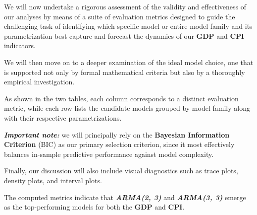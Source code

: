 \documentclass{Configuration_Files/PoliMi3i_thesis}
\begin{document}
We will now undertake a rigorous assessment of the validity and effectiveness of our analyses by means of a suite of evaluation metrics designed to guide the challenging task of identifying which specific model or entire model family and its parametrization best capture and forecast the dynamics of our \textbf{GDP} and \textbf{CPI} indicators.

We will then move on to a deeper examination of the ideal model choice, one that is supported not only by formal mathematical criteria but also by a thoroughly empirical investigation.


As shown in the two tables, each column corresponds to a distinct evaluation metric, while each row lists the candidate models grouped by model family along with their respective parametrizations.


\textbf{\textit{Important note:}} we will principally rely on the \textbf{Bayesian Information Criterion} (BIC) as our primary selection criterion, since it most effectively balances in-sample predictive performance against model complexity.

Finally, our discussion will also include visual diagnostics such as trace plots, density plots, and interval plots.

The computed metrics indicate that \textbf{\textit{ARMA(2, 3)}} and \textbf{\textit{ARMA(3, 3)}} emerge as the top-performing models for both the \textbf{GDP} and \textbf{CPI}.
\end{document}
